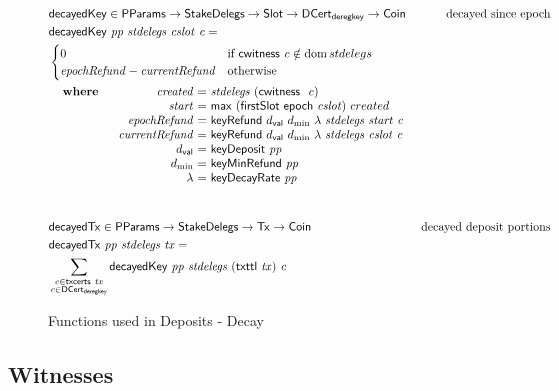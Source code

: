 \begin{figure}[htb]
  \begin{align*}
      & \fun{decayedKey} \in
      \PParams \to \StakeDelegs \to \Slot \to \DCertDeRegKey \to \Coin
      & \text{decayed since epoch} \\
      & \decayedKey{pp}{stdelegs}{cslot}{c} =\\
      & \begin{cases}
            0 & \text{if}~\cwitness c \notin \dom stdelegs\\
            \var{epochRefund} - \var{currentRefund}
            & \text{otherwise}
        \end{cases}\\
      &
      \begin{array}{lr@{~=~}l}
        \where
          & \var{created} & \var{stdelegs}~(\cwitness~\var{c}) \\
          & \var{start} & \mathsf{max}~(\firstSlot{\epoch{cslot}})~created \\
          & \var{epochRefund} & \keyRefund{\dval}{d_{\min}}{\lambda}{stdelegs}{start}{c} \\
          & \var{currentRefund} & \keyRefund{\dval}{d_{\min}}{\lambda}{stdelegs}{cslot}{c} \\
          & \dval & \fun{keyDeposit}~\var{pp}\\
          & d_{\min} & \fun{keyMinRefund}~\var{pp}\\
          & \lambda & \fun{keyDecayRate}~\var{pp}\\
      \end{array}\\
      \nextdef
      & \fun{decayedTx} \in \PParams \to \StakeDelegs \to \Tx \to \Coin
      & \text{decayed deposit portions} \\
      & \decayedTx{pp}{stdelegs}{tx} =\\
      &   \sum\limits_{\substack{c \in \txcerts{tx} \\ c \in\DCertDeRegKey}}
          \decayedKey{pp}{stdelegs}{(\txttl{tx})}{c}\\
  \end{align*}
  \caption{Functions used in Deposits - Decay}
  \label{fig:functions:deposits-decay}
\end{figure}

\clearpage

\subsection{Witnesses}
\label{sec:witnesses-shelley}

